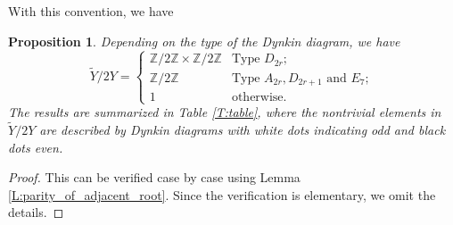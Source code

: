 \documentclass[10pt, letterpaper]{amsart}
\theoremstyle{plain}
\newtheorem{Prop}[equation]{Proposition}
\theoremstyle{definition}
\numberwithin{equation}{section}
\newcommand{\Z}{\mathbb{Z}}
\newcommand{\alphac}{{\check{\alpha}}}
\newcommand{\Yt}{\widetilde{Y}}
\newcommand{\qand}{{\quad\text{and}\quad}}
\begin{document}

With this convention, we have
\begin{Prop}\label{tildYmod2Y}
Depending on the type of the Dynkin diagram, we have
\[
\Yt\slash 2Y=\begin{cases}\Z\slash 2\Z\times \Z\slash 2\Z&\text{Type $D_{2r}$};\\
\Z\slash 2\Z&\text{Type $A_{2r}, D_{2r+1}$ and $E_7$};\\
1&\text{otherwise}.
\end{cases}
\]
The results are summarized in Table \ref{T:table}, where the nontrivial elements in $\Yt\slash 2Y$ are described by Dynkin diagrams with white dots indicating odd and black dots even.
\end{Prop}
\begin{proof}
This can be verified case by case using Lemma \ref{L:parity_of_adjacent_root}. Since the verification is elementary, we omit the details.
\end{proof}
\end{document}
